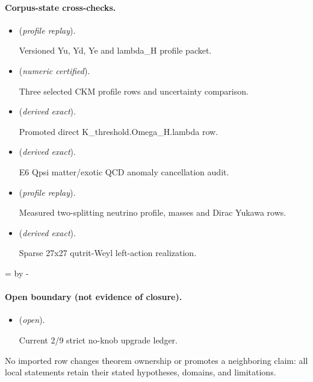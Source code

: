 \documentclass[11pt]{article}
\begin{document}
\paragraph{Corpus-state cross-checks.}
\begin{itemize}
\setlength{\itemsep}{0.25em}
\item {} (\emph{profile replay}).\par Versioned Yu, Yd, Ye and lambda\_H profile packet.
\item {} (\emph{numeric certified}).\par Three selected CKM profile rows and uncertainty comparison.
\item {} (\emph{derived exact}).\par Promoted direct K\_threshold.Omega\_H.lambda row.
\item {} (\emph{derived exact}).\par E6 Qpsi matter/exotic QCD anomaly cancellation audit.
\item {} (\emph{profile replay}).\par Measured two-splitting neutrino profile, masses and Dirac Yukawa rows.
\item {} (\emph{derived exact}).\par Sparse 27x27 qutrit-Weyl left-action realization.
\end{itemize}

\par\begingroup{}=\pagegoal\advance{} by -\pagetotal\ifdim\dimen0<7\baselineskip\newpage\fi\endgroup
\paragraph{Open boundary (not evidence of closure).}
\begin{itemize}
\setlength{\itemsep}{0.25em}
\item {} (\emph{open}).\par Current 2/9 strict no-knob upgrade ledger.
\end{itemize}

No imported row changes theorem ownership or promotes a neighboring claim: all local statements retain their stated hypotheses, domains, and limitations.
\end{document}
